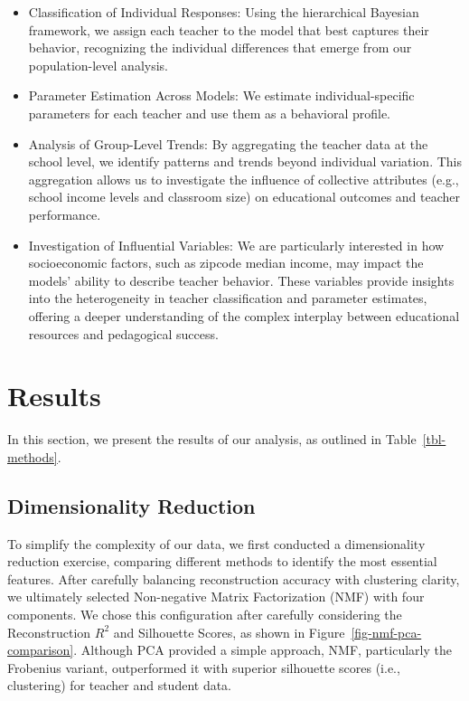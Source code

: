 \documentclass[
  number,
  preprint,
  3p,
  onecolumn]{elsarticle}
\begin{document}
\begin{itemize}
\item
  Classification of Individual Responses: Using the hierarchical
  Bayesian framework, we assign each teacher to the model that best
  captures their behavior, recognizing the individual differences that
  emerge from our population-level analysis.
\item
  Parameter Estimation Across Models: We estimate individual-specific
  parameters for each teacher and use them as a behavioral profile.
\item
  Analysis of Group-Level Trends: By aggregating the teacher data at the
  school level, we identify patterns and trends beyond individual
  variation. This aggregation allows us to investigate the influence of
  collective attributes (e.g., school income levels and classroom size)
  on educational outcomes and teacher performance.
\item
  Investigation of Influential Variables: We are particularly interested
  in how socioeconomic factors, such as zipcode median income, may
  impact the models' ability to describe teacher behavior. These
  variables provide insights into the heterogeneity in teacher
  classification and parameter estimates, offering a deeper
  understanding of the complex interplay between educational resources
  and pedagogical success.
\end{itemize}

\section{Results}\label{results}

In this section, we present the results of our analysis, as outlined in
Table~\ref{tbl-methods}.

\subsection{Dimensionality Reduction}\label{dimensionality-reduction-1}

To simplify the complexity of our data, we first conducted a
dimensionality reduction exercise, comparing different methods to
identify the most essential features. After carefully balancing
reconstruction accuracy with clustering clarity, we ultimately selected
Non-negative Matrix Factorization (NMF) with four components. We chose
this configuration after carefully considering the Reconstruction
\(R^2\) and Silhouette Scores, as shown in
Figure~\ref{fig-nmf-pca-comparison}. Although PCA provided a simple
approach, NMF, particularly the Frobenius variant, outperformed it with
superior silhouette scores (i.e., clustering) for teacher and student
data.
\end{document}
